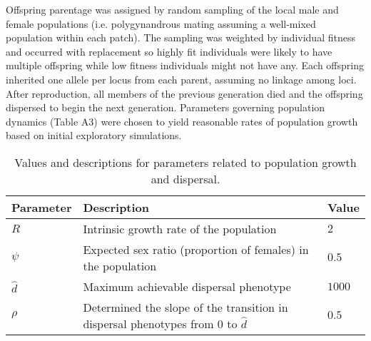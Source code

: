\documentclass[11pt]{article}
\begin{document}
Offspring parentage was assigned by random sampling of the local male and female populations (i.e. polygynandrous mating assuming a well-mixed population within each patch). The sampling was weighted by individual fitness and occurred with replacement so highly fit individuals were likely to have multiple offspring while low fitness individuals might not have any. Each offspring inherited one allele per locus from each parent, assuming no linkage among loci. After reproduction, all members of the previous generation died and the offspring dispersed to begin the next generation. Parameters governing population dynamics (Table A3) were chosen to yield reasonable rates of population growth based on initial exploratory simulations.

\begin{table}
\renewcommand{\arraystretch}{1.5}
  \begin{tabular}{ p{2cm} | p{8cm} | p{2cm} }
    \hline
    Parameter & Description & Value \\ \hline \hline
    $R$ & Intrinsic growth rate of the population & $2$ \\
    $\psi$ & Expected sex ratio (proportion of females) in the population & $0.5$ \\
    $\hat{d}$ & Maximum achievable dispersal phenotype & $1000$ \\
    $\rho$ & Determined the slope of the transition in dispersal phenotypes from $0$ to $\hat{d}$ & $0.5$ \\
    \hline
  \end{tabular}
\caption[LoF entry]{Values and descriptions for parameters related to population growth and dispersal.}
\label{table:PopPars}
\end{table}
\end{document}
